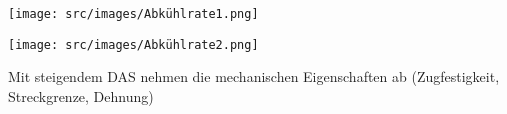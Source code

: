 \begin{minipage}{0.5\linewidth}
    \texttt{[image: src/images/Abkühlrate1.png]}
\end{minipage}
\begin{minipage}{0.5\linewidth}
    \texttt{[image: src/images/Abkühlrate2.png]}
\end{minipage}
Mit steigendem DAS nehmen die mechanischen Eigenschaften ab (Zugfestigkeit, Streckgrenze, Dehnung)